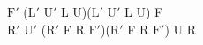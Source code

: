 $\text{F}'$ ($\text{L}'$ $\text{U}'$ L U)($\text{L}'$ $\text{U}'$ L U) F\\
$\text{R}'$ $\text{U}'$ ($\text{R}'$ F R $\text{F}'$)($\text{R}'$ F R $\text{F}'$) U R\\
